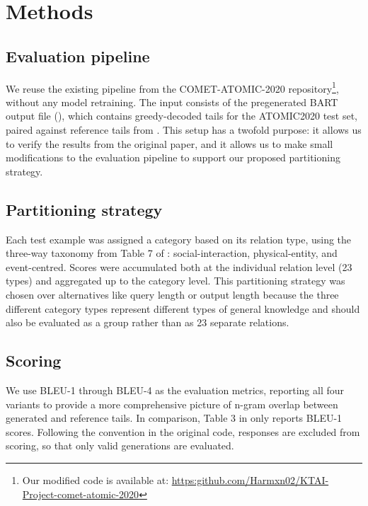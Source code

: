 \section{Methods}
\label{sec:methods}



\subsection{Evaluation pipeline}

We reuse the existing  pipeline from the COMET-ATOMIC-2020 repository\footnote{Our modified code is available at: \url{https:github.com/Harmxn02/KTAI-Project-comet-atomic-2020}}, without any model retraining. The input consists of the pregenerated BART output file (), which contains greedy-decoded tails for the ATOMIC2020 test set, paired against reference tails from . This setup has a twofold purpose: it allows us to verify the results from the original paper, and it allows us to make small modifications to the evaluation pipeline to support our proposed partitioning strategy.



\subsection{Partitioning strategy}

Each test example was assigned a category based on its relation type, using the three-way taxonomy from Table 7 of \citet{hwang2021cometatomic}: social-interaction, physical-entity, and event-centred. Scores were accumulated both at the individual relation level (23 types) and aggregated up to the category level. This partitioning strategy was chosen over alternatives like query length or output length because the three different category types represent different types of general knowledge and should also be evaluated as a group rather than as 23 separate relations.



\subsection{Scoring}

We use BLEU-1 through BLEU-4 as the evaluation metrics, reporting all four variants to provide a more comprehensive picture of n-gram overlap between generated and reference tails. In comparison, Table 3 in \citet{hwang2021cometatomic} only reports BLEU-1 scores. Following the convention in the original code,  responses are excluded from scoring, so that only valid generations are evaluated.

